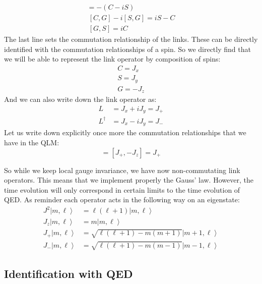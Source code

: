 \documentclass[10pt]{article}
\newcommand{\ket}[1]{\ensuremath{\left|#1\right\rangle}}
\begin{document}
\begin{eqnarray}
[C - i S,G] = -(C - iS)\\
~[C,G] - i [S,G] = iS -C\nonumber\\
~[G,S] = iC\label{Eq:CommSpinLinks}
\end{eqnarray}
The last line sets the commutation relationship of the links. These can be directly identified with the commutation relationships of a spin. 
So we directly find that we will be able to represent the link operator by composition of spins:
\begin{eqnarray}
C = J_x\\
S = J_y\\
G = -J_z
\end{eqnarray}
And we can also write down the link operator as:
\begin{eqnarray}
L &= J_x + iJ_y = J_+\\
L^\dag &=J_x - iJ_y = J_-
\end{eqnarray}
Let us write down explicitly once more the commutation relationships that we have in the QLM:
\begin{equation}
[L_i, G^L_i]=[J_+, -J_z] =J_+\label{eq:CommLinkQLM}
\end{equation}

So while we keep local gauge invariance, we have now non-commutating link operators. This means that we implement properly the Gauss' law. However, the time evolution will only correspond in certain limits to the time evolution of QED. As reminder each operator acts in the following way on an eigenstate:
\begin{eqnarray}
J^2 \ket{m,\ell}&= \ell(\ell+1)\ket{m,\ell}\\
J_z \ket{m,\ell}&= m\ket{m,\ell}\\
J_+\ket{m,\ell} &=\sqrt{\ell(\ell+1)-m(m+1)}\ket{m+1,\ell}\\
J_-\ket{m,\ell} &=\sqrt{\ell(\ell+1)-m(m-1)}\ket{m-1,\ell}
\end{eqnarray}

\subsection{Identification with QED}
\end{document}
